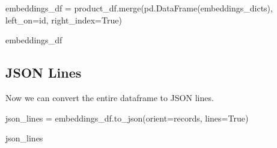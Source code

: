 \documentclass[
  letterpaper,
  DIV=11,
  numbers=noendperiod]{scrreprt}
\newenvironment{Shaded}{\begin{snugshade}}{\end{snugshade}}
\newcommand{\NormalTok}[1]{\textcolor[rgb]{0.00,0.23,0.31}{#1}}
\newcommand{\OperatorTok}[1]{\textcolor[rgb]{0.37,0.37,0.37}{#1}}
\newcommand{\StringTok}[1]{\textcolor[rgb]{0.13,0.47,0.30}{#1}}
\newcommand{\VariableTok}[1]{\textcolor[rgb]{0.07,0.07,0.07}{#1}}
\begin{document}
\begin{Shaded}
\begin{Highlighting}[]
\NormalTok{embeddings\_df }\OperatorTok{=}\NormalTok{ product\_df.merge(pd.DataFrame(embeddings\_dicts), left\_on}\OperatorTok{=}\StringTok{\textquotesingle{}id\textquotesingle{}}\NormalTok{, right\_index}\OperatorTok{=}\VariableTok{True}\NormalTok{)}
\end{Highlighting}
\end{Shaded}

\begin{Shaded}
\begin{Highlighting}[]
\NormalTok{embeddings\_df}
\end{Highlighting}
\end{Shaded}

\hypertarget{json-lines}{%
\subsection{JSON Lines}\label{json-lines}}

Now we can convert the entire dataframe to JSON lines.

\begin{Shaded}
\begin{Highlighting}[]
\NormalTok{json\_lines }\OperatorTok{=}\NormalTok{ embeddings\_df.to\_json(orient}\OperatorTok{=}\StringTok{\textquotesingle{}records\textquotesingle{}}\NormalTok{, lines}\OperatorTok{=}\VariableTok{True}\NormalTok{)}
\end{Highlighting}
\end{Shaded}

\begin{Shaded}
\begin{Highlighting}[]
\NormalTok{json\_lines}
\end{Highlighting}
\end{Shaded}
\end{document}
